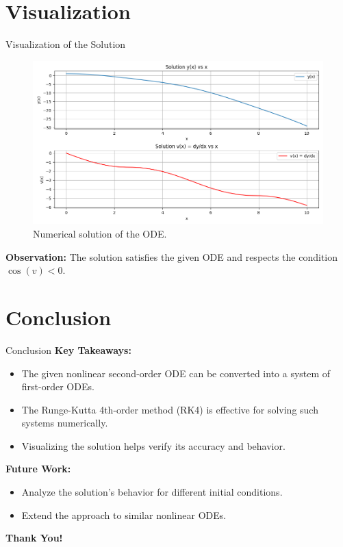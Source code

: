 \documentclass[aspectratio=43]{beamer}
\begin{document}
\section{Visualization}
\begin{frame}{Visualization of the Solution}
    \begin{figure}[h]
        \centering
        \includegraphics[width=0.8\linewidth]{fig/Figure_1.png}
        \caption{Numerical solution of the ODE.}
    \end{figure}
    \pause
    \textbf{Observation:} The solution satisfies the given ODE and respects the condition \( \cos(v) < 0 \).
\end{frame}

\section{Conclusion}
\begin{frame}{Conclusion}
    \textbf{Key Takeaways:}
    \begin{itemize}
        \item The given nonlinear second-order ODE can be converted into a system of first-order ODEs.
        \item The Runge-Kutta 4th-order method (RK4) is effective for solving such systems numerically.
        \item Visualizing the solution helps verify its accuracy and behavior.
    \end{itemize}
    \pause
    \textbf{Future Work:}
    \begin{itemize}
        \item Analyze the solution's behavior for different initial conditions.
        \item Extend the approach to similar nonlinear ODEs.
    \end{itemize}
\end{frame}

\begin{frame}[plain]
    \centering
    \Huge \textbf{Thank You!}
\end{frame}
\end{document}
